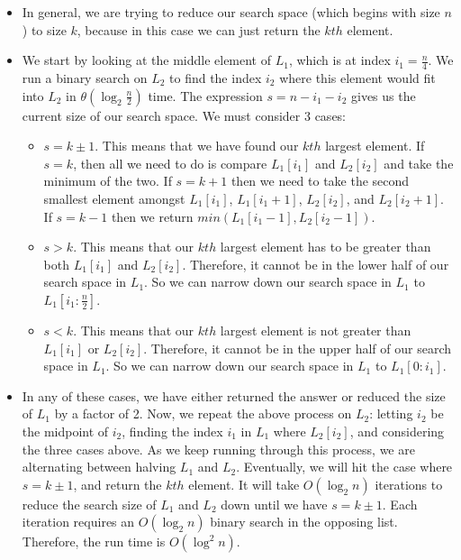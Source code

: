 \documentclass[12pt,twoside]{article}
\begin{document}
\begin{problems}
\begin{problemparts}
\begin{itemize}
\item In general, we are trying to reduce our search space (which begins with size $n$) to size $k$, because in this case we can just return the $kth$ element.

\item We start by looking at the middle element of $L_1$, which is at index $i_1 = \frac{n}{4}$. We run a binary search on $L_2$ to find the index $i_2$ where this element would fit into $L_2$ in $\theta(\log _2 \frac{n}{2})$ time. The expression $s = n - i_1 - i_2$ gives us the current size of our search space. We must consider 3 cases:

\begin{itemize}
\item $s = k \pm 1$. This means that we have found our $kth$ largest element. If $s=k$, then all we need to do is compare $L_1[i_1]$ and $L_2[i_2]$ and take the minimum of the two. If $s=k+1$ then we need to take the second smallest element amongst $L_1[i_1]$, $L_1[i_1+1]$, $L_2[i_2]$, and $L_2[i_2+1]$. If $s=k-1$ then we return $min(L_1[i_1-1], L_2[i_2-1])$.
\item $s > k$. This means that our $kth$ largest element has to be greater than both $L_1[i_1]$ and $L_2[i_2]$. Therefore, it cannot be in the lower half of our search space in $L_1$. So we can narrow down our search space in $L_1$ to $L_1[i_1:\frac{n}{2}]$.
\item $s < k$. This means that our $kth$ largest element is not greater than $L_1[i_1]$ or $L_2[i_2]$. Therefore, it cannot be in the upper half of our search space in $L_1$. So we can narrow down our search space in $L_1$ to $L_1[0:i_1]$.
\end{itemize}

\item In any of these cases, we have either returned the answer or reduced the size of $L_1$ by a factor of 2. Now, we repeat the above process on $L_2$: letting $i_2$ be the midpoint of $i_2$, finding the index $i_1$ in $L_1$ where $L_2[i_2]$, and considering the three cases above. As we keep running through this process, we are alternating between halving $L_1$ and $L_2$. Eventually, we will hit the case where $s = k \pm 1$, and return the $kth$ element. It will take $O(\log_2 n)$ iterations to reduce the search size of $L_1$ and $L_2$ down until we have $s = k \pm 1$. Each iteration requires an $O(\log_2 n)$ binary search in the opposing list. Therefore, the run time is $O(\log ^2 n)$.

\end{itemize}


\end{problemparts}
\end{problems}
\end{document}
